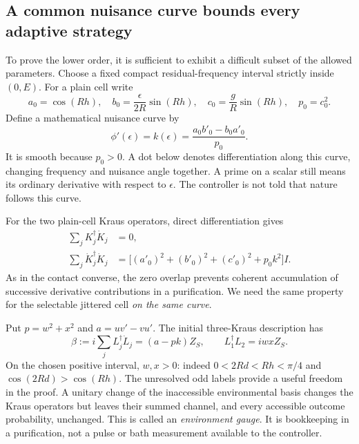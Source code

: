 \documentclass[11pt,a4paper]{article}
\numberwithin{equation}{section}
\theoremstyle{remark}
\begin{document}
\subsection{A common nuisance curve bounds every adaptive strategy}

To prove the lower order, it is sufficient to exhibit a difficult subset
of the allowed parameters. Choose a fixed compact residual-frequency
interval strictly inside $(0,E)$. For a plain cell write
\begin{equation}
 a_0=\cos(Rh),\quad b_0=\frac{\epsilon}{2R}\sin(Rh),\quad
 c_0=\frac{g}{R}\sin(Rh),\quad p_0=c_0^2.
\end{equation}
Define a mathematical nuisance curve by
\begin{equation}
 \phi'(\epsilon)=k(\epsilon)
 =\frac{a_0b'_0-b_0a'_0}{p_0}.
 \label{tim:nuisance-curve}
\end{equation}
It is smooth because $p_0>0$. A dot below denotes differentiation along
this curve, changing frequency and nuisance angle together. A prime on a
scalar still means its ordinary derivative with respect to $\epsilon$.
The controller is not told that nature follows this curve.

For the two plain-cell Kraus operators, direct differentiation gives
\begin{align}
 \sum_jK_j^\dagger\dot K_j&=0,\nonumber\\
 \sum_j\dot K_j^\dagger\dot K_j
 &=\bigl[(a'_0)^2+(b'_0)^2+(c'_0)^2+p_0k^2\bigr]I.
 \label{tim:plain-derivative}
\end{align}
As in the contact converse, the zero overlap prevents coherent accumulation
of successive derivative contributions in a purification. We need the same
property for the selectable jittered cell \emph{on the same curve}.

Put $p=w^2+x^2$ and $a=uv'-vu'$. The initial three-Kraus description has
\begin{equation}
 \beta:=i\sum_jL_j^\dagger\dot L_j=(a-pk)Z_S,
 \qquad L_1^\dagger L_2=iwxZ_S.
\end{equation}
On the chosen positive interval, $w,x>0$: indeed
$0<2Rd<Rh<\pi/4$ and $\cos(2Rd)>\cos(Rh)$.
The unresolved odd labels provide a useful freedom in the proof.
A unitary change of the inaccessible environmental basis changes the Kraus
operators but leaves their summed channel, and every accessible outcome
probability, unchanged. This is called an \emph{environment gauge}. It is
bookkeeping in a purification, not a pulse or bath measurement available to
the controller.
\end{document}
